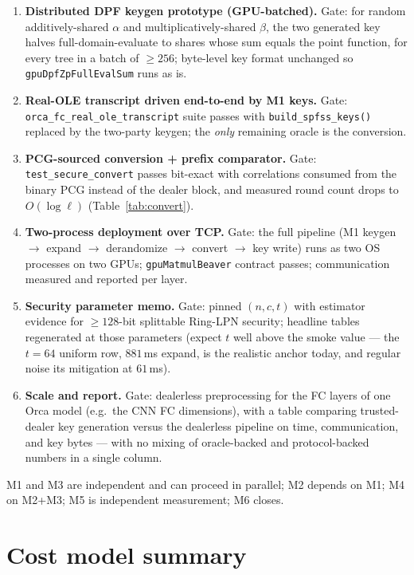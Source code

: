 \documentclass[11pt]{article}
\begin{document}
\begin{enumerate}[leftmargin=2.4em,label=\textbf{M\arabic*.}]
\item \textbf{Distributed DPF keygen prototype (GPU-batched).}
  Gate: for random additively-shared $\alpha$ and multiplicatively-shared
  $\beta$, the two generated key halves full-domain-evaluate to shares whose
  sum equals the point function, for every tree in a batch of $\ge 256$;
  byte-level key format unchanged so \texttt{gpuDpfZpFullEvalSum} runs as is.
\item \textbf{Real-OLE transcript driven end-to-end by M1 keys.}
  Gate: \texttt{orca\_fc\_real\_ole\_transcript} suite passes with
  \texttt{build\_spfss\_keys()} replaced by the two-party keygen; the
  \emph{only} remaining oracle is the conversion.
\item \textbf{PCG-sourced conversion + prefix comparator.}
  Gate: \texttt{test\_secure\_convert} passes bit-exact with correlations
  consumed from the binary PCG instead of the dealer block, and measured
  round count drops to $O(\log \ell)$ (Table~\ref{tab:convert}).
\item \textbf{Two-process deployment over TCP.}
  Gate: the full pipeline (M1 keygen $\to$ expand $\to$ derandomize $\to$
  convert $\to$ key write) runs as two OS processes on two GPUs;
  \texttt{gpuMatmulBeaver} contract passes; communication measured and
  reported per layer.
\item \textbf{Security parameter memo.}
  Gate: pinned $(n, c, t)$ with estimator evidence for $\ge 128$-bit
  splittable Ring-LPN security; headline tables regenerated at those
  parameters (expect $t$ well above the smoke value --- the $t{=}64$ uniform
  row, $881$\,ms expand, is the realistic anchor today, and regular noise its
  mitigation at $61$\,ms).
\item \textbf{Scale and report.}
  Gate: dealerless preprocessing for the FC layers of one Orca model
  (e.g.\ the CNN FC dimensions), with a table comparing trusted-dealer
  key generation versus the dealerless pipeline on time, communication, and
  key bytes --- with no mixing of oracle-backed and protocol-backed numbers
  in a single column.
\end{enumerate}

M1 and M3 are independent and can proceed in parallel; M2 depends on M1;
M4 on M2+M3; M5 is independent measurement; M6 closes.

\section{Cost model summary}
\label{sec:cost}
\end{document}
